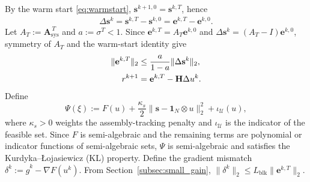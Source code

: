 \documentclass[letterpaper, 10 pt, conference]{ieeeconf} %
\begin{document}
By the warm start \eqref{eq:warmstart}, \(\mathbf s^{k+1,0}=\mathbf s^{k,T}\), hence
\begin{align}
\Delta \mathbf s^k = \mathbf s^{k,T}-\mathbf s^{k,0}
= \mathbf e^{k,T}-\mathbf e^{k,0}.
\end{align}
Let \(A_T:=\mathbf A_{\mathrm{sys}}^{\,T}\) and \(a:=\sigma^T<1\). Since \(\mathbf e^{k,T}=A_T\mathbf e^{k,0}\) and \(\Delta\mathbf s^k=(A_T-I)\mathbf e^{k,0}\), symmetry of \(A_T\) and the warm-start identity give
\begin{align}
\|\mathbf e^{k,T}\|_2
&\le \frac{a}{1-a}\|\Delta\mathbf s^k\|_2,
\label{eq:eT_deltas_bound}\\
r^{k+1}
&=\mathbf e^{k,T}-\mathbf H\Delta u^k .
\notag
\end{align}
Define
\begin{equation}\label{eq:Psi_conf}
\Psi(\xi) := F(u) 
+ \frac{\kappa_s}{2}\|\mathbf{s} - \mathbf{1}_N\otimes u\|_2^2 
+ \iota_{\mathcal{U}}(u),
\end{equation}
where $\kappa_s>0$ weights the assembly-tracking penalty and $\iota_{\mathcal U}$ is the indicator of the feasible set. Since $F$ is semi-algebraic and the remaining terms are polynomial or indicator functions of semi-algebraic sets, $\Psi$ is semi-algebraic and satisfies the Kurdyka--\L{}ojasiewicz (KL) property. Define the gradient mismatch \(\delta^k:=\hat g^k-\nabla F(u^k)\). From Section~\ref{subsec:small_gain}, \(\|\delta^k\|_2\le L_{\mathrm{blk}}\|\mathbf e^{k,T}\|_2\).
\end{document}
